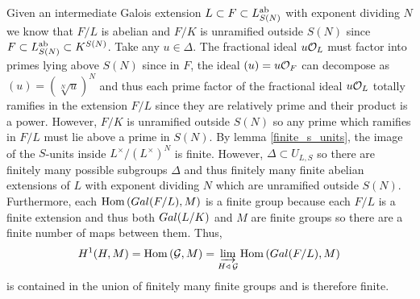 \documentclass[12pt]{extarticle}
\begin{document}
Given an intermediate Galois extension $L \subset F \subset L^{\mathrm{ab}}_{S(N)}$ with exponent dividing $N$ we know that $F/L$ is abelian and $F/K$ is unramified outside $S(N)$ since $F \subset L^{\mathrm{ab}}_{S(N)} \subset K^{S(N)}$. Take any $u \in \Delta$. The fractional ideal $u \mathcal{O}_{L}$ must factor into primes lying above $S(N)$ since in $F$, the ideal $(u) = u \mathcal{O}_{F}$ can decompose as $(u) = (\sqrt[N]{u})^N$ and thus each prime factor of the fractional ideal $u \mathcal{O}_{L}$ totally ramifies in the extension $F/L$ since they are relatively prime and their product is a power. However, $F/K$ is unramified outside $S(N)$ so any prime which ramifies in $F/L$ must lie above a prime in $S(N)$.  By lemma \ref{finite_s_units}, the image of the $S$-units inside $L^\times / (L^\times)^N$ is finite. However, $\Delta \subset U_{L,S}$ so there are finitely many possible subgroups $\Delta$ and thus finitely many finite abelian extensions of $L$ with exponent dividing $N$ which are unramified outside $S(N)$. Furthermore, each $\mathrm{Hom}\left( Gal \small(F / L \small) , M\right)$ is a finite group because each $F/L$ is a finite extension and thus both $Gal \small(L/K \small)$ and $M$ are finite groups so there are a finite number of maps between them. Thus, 
\[ H^1(H, M) = \mathrm{Hom}\left(\mathcal{G}, M\right) = \varinjlim_{H \triangleleft \: \mathcal{G}} \mathrm{Hom}\left( Gal \small(F / L \small) , M\right) \]
is contained in the union of finitely many finite groups and is therefore finite. 

\section{}
\end{document}
